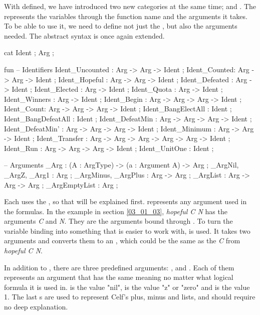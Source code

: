 With  defined, we have introduced two new categories at the same time;  and . The  represents the variables through the function name and the arguments it takes. To be able to use it, we need to define not just the , but also the arguments needed. The abstract syntax is once again extended.

\begin{lstgf}
    cat
        Ident ; Arg ;

    fun
        -- Identifiers
        Ident_Uncounted : Arg -> Arg -> Ident ;
        Ident_Counted: Arg -> Arg -> Ident ;
        Ident_Hopeful : Arg -> Arg -> Ident ;
        Ident_Defeated : Arg -> Ident ;
        Ident_Elected : Arg -> Ident ;
        Ident_Quota : Arg -> Ident ;
        Ident_Winners : Arg -> Ident ;
        Ident_Begin : Arg -> Arg -> Arg -> Ident ;
        Ident_Count: Arg -> Arg -> Arg -> Ident ;
        Ident_BangElectAll : Ident ;
        Ident_BangDefeatAll : Ident ;
        Ident_DefeatMin : Arg -> Arg -> Arg -> Ident ;
        Ident_DefeatMin' : Arg -> Arg -> Arg -> Ident ;
        Ident_Minimum : Arg -> Arg -> Ident ;
        Ident_Transfer : Arg -> Arg -> Arg -> Arg -> Arg -> Ident ;
        Ident_Run : Arg -> Arg -> Arg -> Ident ;
        Ident_UnitOne : Ident ;

        -- Arguments
        _Arg : (A : ArgType) -> (a : Argument A) -> Arg ;
        _ArgNil, _ArgZ, _Arg1 : Arg ;
        _ArgMinus, _ArgPlus : Arg -> Arg ;
        _ArgList : Arg -> Arg -> Arg ;
        _ArgEmptyList : Arg ;
\end{lstgf}

Each  uses the , so that will be explained first.  represents any argument used in the formulas. In the example in section \ref{03_01_03}, \textit{hopeful C N} has the arguments \textit{C} and \textit{N}. They are the arguments bound through . To turn the variable binding into something that is easier to work with,  is used. It takes two arguments and converts them to an , which could be the same as the \textit{C} from \textit{hopeful C N}. 

In addition to , there are three predefined arguments: ,  and . Each of them represents an argument that has the same meaning no matter what logical formula it is used in.  is the value "nil",  is the value "z" or "zero" and  is the value 1. The last s are used to represent Celf's plus, minus and lists, and should require no deep explanation. 

